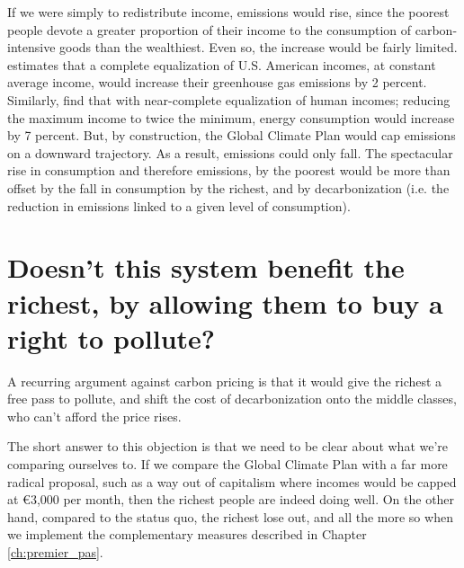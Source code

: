 \documentclass[a5paper,english,openany]{memoir}
\begin{document}
If we were simply to redistribute income, emissions would rise, since the poorest people devote a greater proportion of their income to the consumption of carbon-intensive goods than the wealthiest. Even so, the increase would be fairly limited. \cite{sager_income_2019} estimates that a complete equalization of U.S. American incomes, at constant average income, %
would increase their greenhouse gas emissions by 2 percent. Similarly, \cite{oswald_global_2021} find that with near-complete equalization of human incomes; reducing the maximum income to twice the minimum, %
energy consumption would increase by 7 percent. 
But, by construction, the Global Climate Plan would cap emissions on a downward trajectory. As a result, emissions could only fall. The spectacular rise in consumption and therefore emissions, %
by the poorest would be more than offset by the fall in consumption by the richest, and by decarbonization (i.e. the reduction in emissions linked to a given level of consumption).

\section*{\normalsize Doesn't this system benefit the richest, by allowing them to buy a right to pollute?}\label{q:riches}

A recurring argument against carbon pricing is that it would give the richest a free pass to pollute, and shift the cost of decarbonization onto the middle classes, who can't %
afford the price rises. 

The short answer to this objection is that we need to be clear about what we're %
comparing ourselves to. If we compare the Global Climate Plan with a far more radical proposal, such as a way out of capitalism where incomes would be capped at \euro{}3,000 per month, then the richest people are indeed doing well. On the other hand, compared to the status quo, the richest lose out, and all the more so when we implement the complementary measures described in Chapter \ref{ch:premier_pas}. %
\end{document}

